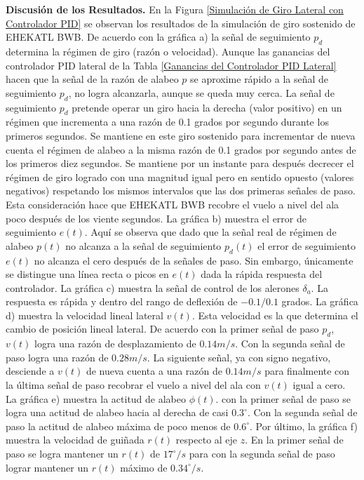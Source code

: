 \textbf{Discusión de los Resultados.} En la Figura \ref{Simulación de Giro Lateral con Controlador PID} se observan los resultados de la simulación de giro sostenido de EHEKATL BWB.
%
De acuerdo con la gráfica a) la señal de seguimiento $p_d$ determina la régimen de giro (razón o velocidad). 
Aunque las ganancias del controlador PID lateral de la Tabla \ref{Ganancias del Controlador PID Lateral}  hacen que la señal de la razón de alabeo $p$ se aproxime rápido a la señal de seguimiento $p_d$, no logra alcanzarla, aunque se queda muy cerca. La señal de seguimiento $p_d$ pretende operar un giro hacia la derecha (valor positivo) en un régimen que incrementa a una razón de 0.1 grados por segundo durante los primeros segundos. Se mantiene en este giro sostenido para incrementar de nueva cuenta el régimen de alabeo a la misma razón de 0.1 grados por segundo antes de los primeros diez segundos. 
Se mantiene por un instante para después decrecer el régimen de giro logrado con una magnitud igual pero en sentido opuesto (valores negativos) respetando los mismos intervalos que las dos primeras señales de paso. Esta consideración hace que EHEKATL BWB recobre el vuelo a nivel del ala poco después de los viente segundos. 
%
La gráfica b) muestra el error de seguimiento $e(t)$. Aquí se observa que dado que la señal real de régimen de alabeo $p(t)$ no alcanza a la señal de seguimiento $p_d(t)$ el error de seguimiento $e(t)$ no alcanza el cero después de la señales de paso. Sin embargo, únicamente se distingue una línea recta o picos en $e(t)$ dada la rápida respuesta del controlador. 
%
La gráfica c) muestra la señal de control de los alerones $\delta_a$.  
La respuesta es rápida y dentro del rango de deflexión de $-0.1 / 0.1$ grados. 
%
La gráfica d) muestra la velocidad lineal lateral $v(t)$. Esta velocidad es la que determina el cambio de posición lineal lateral. De acuerdo con la primer señal de paso $p_d$, $v(t)$ logra una razón de desplazamiento de $0.14m/s$. Con la segunda señal de paso logra una razón de $0.28m/s$. La siguiente señal, ya con signo negativo, desciende a $v(t)$ de nueva cuenta a una razón de  $0.14m/s$ para finalmente con la última señal de paso recobrar el vuelo a nivel del ala con $v(t)$ igual a cero. 
%
La gráfica e) muestra la actitud de alabeo $\phi(t)$. con la primer señal de paso se logra una actitud de alabeo hacia al derecha de casi $0.3 ^\circ$. Con la segunda señal de paso la actitud de alabeo máxima de poco menos de $0.6 ^\circ$. 
%
Por último, la gráfica f) muestra la velocidad de guiñada $r(t)$ respecto al eje $z$. En la primer señal de paso se logra mantener un $r(t)$ de $17 ^\circ/s$ para con la segunda señal de paso lograr mantener un $r(t)$ máximo de $0.34 ^\circ/s$.


